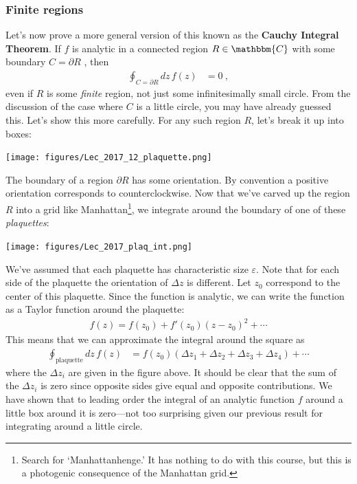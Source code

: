 \subsubsection{Finite regions}

Let's now prove a more general version of this known as the \textbf{Cauchy Integral Theorem}. If $f$ is analytic in a connected region $R \in \mathbbm{C}$ with some boundary $C = \partial R$ , then 
\begin{align}
	\oint_{C=\partial R} dz\, f(z) &= 0 \ ,
\end{align}
even if $R$ is some \emph{finite} region, not just some infinitesimally small circle. From the discussion of the case where $C$ is a little circle, you may have already guessed this. Let's show this more carefully. For any such region $R$, let's break it up into boxes:
\begin{center}
\texttt{[image: figures/Lec\_2017\_12\_plaquette.png]}
\end{center}
The boundary of a region $\partial R$ has some orientation. By convention a positive orientation corresponds to counterclockwise. Now that we've carved up the region $R$ into a grid like Manhattan\footnote{Search for `Manhattanhenge.' It has nothing to do with this course, but this is a photogenic consequence of the Manhattan grid.}, we integrate around the boundary of one of these \emph{plaquettes}:
\begin{center}
\texttt{[image: figures/Lec\_2017\_plaq\_int.png]}
\end{center}
We've assumed that each plaquette has characteristic size $\varepsilon$. Note that for each side of the plaquette the orientation of $\Delta z$ is different. Let $z_0$ correspond to the center of this plaquette. Since the function is analytic, we can write the function as a Taylor function around the plaquette:
\begin{align}
	f(z) = f(z_0) + f'(z_0) (z-z_0)^2 + \cdots
\end{align}
This means that we can approximate the integral around the square as
\begin{align}
	\oint_\text{plaquette} dz\,  f(z)
	&= 
	f(z_0)
	\left(
		\Delta z_1 + \Delta z_2 + \Delta z_3 + \Delta z_4
	\right)
	+ \cdots
\end{align}
where the $\Delta z_i$ are given in the figure above. It should be clear that the sum of the $\Delta z_i$ is zero since opposite sides give equal and opposite contributions. We have shown that to leading order the integral of an analytic function $f$ around a little box around it is zero---not too surprising given our previous result for integrating around a little circle. 
